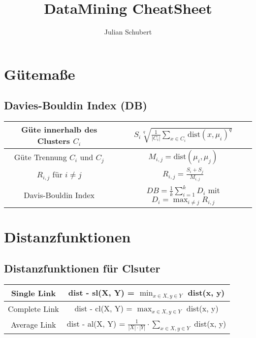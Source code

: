 \documentclass[14pt]{article}
\title{DataMining CheatSheet}
\author{Julian Schubert}
\begin{document}
\maketitle

\section{Gütemaße}
\subsection{Davies-Bouldin Index (DB)}
    \begin{tabular}{| c | c |}
        \hline
        Güte innerhalb des Clusters $C_i$ 
            & $S_i \sqrt[q]{\frac{1}{|C_i|} \sum_{x \in C_i}\text{dist}(x, \mu_i)^q}$ \\
        \hline
        Güte Trennung $C_i$ und $C_j$
            & $M_{i,j} = $dist$(\mu_i, \mu_j)$ \\
        \hline
        $R_{i,j}$ für $i \neq j$
            & $R_{i, j} = \frac{S_i + S_j}{M_{i, j}}$ \\
        \hline
        Davis-Bouldin Index
            & $DB = \frac{1}{k} \sum_{i = 1}^k D_i$ mit $D_i = \max_{i \neq j} R_{i,j}$ \\
        \hline
    \end{tabular}
\section{Distanzfunktionen}
\subsection{Distanzfunktionen für Clsuter}
    \begin{tabular}{| c | c |}
        \hline
        Single Link 
            & dist - sl(X, Y) = $\min_{x \in X, y \in Y}$ dist(x, y) \\
        \hline
        Complete Link
            & dist - cl(X, Y) = $\max_{x \in X, y \in Y}$ dist(x, y) \\
        \hline
        Average Link
            & dist - al(X, Y) = $\frac{1}{|X| \cdot |Y|} \cdot \sum_{x \in X, y\in Y}$ dist(x, y) \\
        \hline
    \end{tabular}
\end{document}
